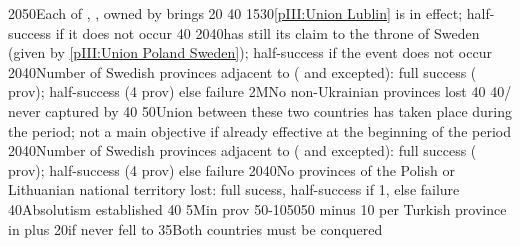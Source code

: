 %
%
%
{20}{50}{Each of \provinceKurland, \provinceMemel, \provincePreussen owned by
  \paysmajeurPologne brings 20\VPs}%
%
%
{}{40}{}%
%
%
{15}{30}{\ref{pIII:Union Lublin} is in effect; half-success if it does not
  occur}%
%
%
{}{40}{}%
%
%
{20}{40}{\POL has still its claim to the throne of Sweden (given by
  \ref{pIII:Union Poland Sweden}); half-success if the event does not occur}%
%
%
%
{20}{40}{Number of Swedish provinces adjacent to \regionBaltique (\regionSuede
  and \regionFinlande excepted): full success ( prov);
  half-success (4 prov) else failure}%
%
\EUobjective2M{No non-Ukrainian provinces lost}{}%
{}{40}{}%
%
%
{}{40}{\provinceOsterreich/ never captured by
  }%
%
%
{}{40}{}%
%
%
%
{}{50}{Union between these two countries has taken place during the period;
  not a main objective if already effective at the beginning of the period}%
%
%
%
{20}{40}{Number of Swedish provinces adjacent to \regionBaltique (\regionSuede
  and \regionFinlande excepted): full success ( prov);
  half-success (4 prov) else failure}%
%
%
{20}{40}{No provinces of the Polish or Lithuanian national territory lost:
  full sucess, half-success if 1, else failure}%
%
%
{}{40}{Absolutism established}%
%
%
{}{40}{}%
%
\EUobjective5M{\TUR in \payshongrie}{prov}%
{50-10}{50}{50 \VPs minus 10 \VPs per Turkish province in \payshongrie plus
  20\VPs if \villeVienne never fell to \TUR}%
%
 
%
%
{}{35}{Both countries must be conquered}%
%
%
